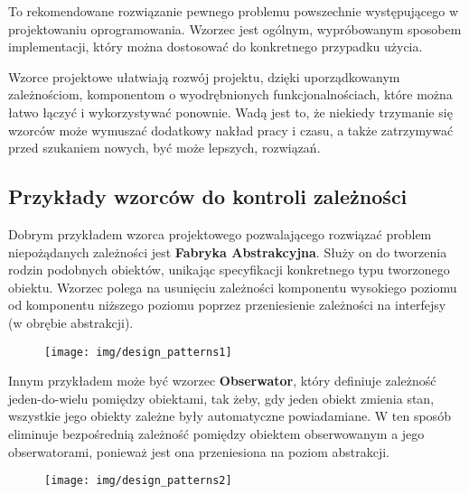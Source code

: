 \begin{definition}
To rekomendowane rozwiązanie pewnego problemu powszechnie występującego w projektowaniu oprogramowania. Wzorzec jest ogólnym, wypróbowanym sposobem implementacji, który można dostosować do konkretnego przypadku użycia.
\end{definition}
Wzorce projektowe ułatwiają rozwój projektu, dzięki uporządkowanym zależnościom, komponentom o wyodrębnionych funkcjonalnościach, które można łatwo łączyć i wykorzystywać ponownie. Wadą jest to, że niekiedy trzymanie się wzorców może wymuszać dodatkowy nakład pracy i czasu, a także zatrzymywać przed szukaniem nowych, być może lepszych, rozwiązań.

\subsection{Przykłady wzorców do kontroli zależności}
Dobrym przykładem wzorca projektowego pozwalającego rozwiązać problem niepożądanych zależności jest \textbf{Fabryka Abstrakcyjna}. Służy on do tworzenia rodzin podobnych obiektów, unikając specyfikacji konkretnego typu tworzonego obiektu. Wzorzec polega na usunięciu zależności komponentu wysokiego poziomu od komponentu niższego poziomu poprzez przeniesienie zależności na interfejsy (w obrębie abstrakcji).
\begin{figure}[h]
    \centering
    \texttt{[image: img/design\_patterns1]}
\end{figure}

Innym przykładem może być wzorzec \textbf{Obserwator}, który definiuje zależność jeden-do-wielu pomiędzy obiektami, tak żeby, gdy jeden obiekt zmienia stan, wszystkie jego obiekty zależne były automatyczne powiadamiane. W ten sposób eliminuje bezpośrednią zależność pomiędzy obiektem obserwowanym a jego obserwatorami, ponieważ jest ona przeniesiona na poziom abstrakcji.
\begin{figure}[h]
    \centering
    \texttt{[image: img/design\_patterns2]}
\end{figure}